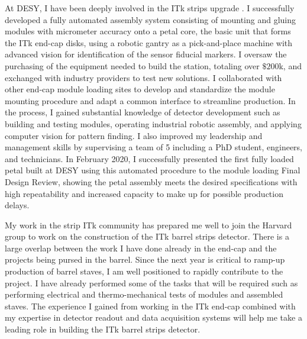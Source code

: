 \documentclass[a4paper]{article}
\begin{document}
At DESY, I have been deeply involved in the ITk strips upgrade \cite{ITKstrips}. I successfully developed a fully automated assembly system consisting of mounting and gluing modules with micrometer accuracy onto a petal core, the basic unit that forms the ITk end-cap disks, using a robotic gantry as a pick-and-place machine with advanced vision for identification of the sensor fiducial markers. I oversaw the purchasing of the equipment needed to build the station, totaling over $\$200$k, and exchanged with industry providers to test new solutions. I collaborated with other end-cap module loading sites to develop and standardize the module mounting procedure and adapt a common interface to streamline production. In the process, I gained substantial knowledge of detector development such as building and testing modules, operating industrial robotic assembly, and applying computer vision for pattern finding. I also improved my leadership and management skills by supervising a team of 5 including a PhD student, engineers, and technicians. In February 2020, I successfully presented the first fully loaded petal built at DESY using this automated procedure to the module loading Final Design Review, showing the petal assembly meets the desired specifications with high repeatability and increased capacity to make up for possible production delays.

\bigskip

My work in the strip ITk community has prepared me well to join the Harvard group to work on the construction of the ITk barrel strips detector.
There is a large overlap between the work I have done already in the end-cap and the projects being pursed in the barrel. Since the next year is critical to ramp-up production of barrel staves, I am well positioned to rapidly contribute to the project. I have already performed some of the tasks that will be required such as performing electrical and thermo-mechanical tests of modules and assembled staves. The experience I gained from working in the ITk end-cap combined with my expertise in detector readout and data acquisition systems will help me take a leading role in building the ITk barrel strips detector.

\bigskip
\end{document}
